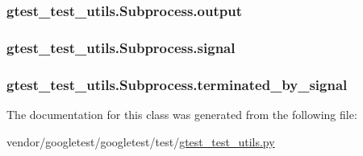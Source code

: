 \subsubsection[{\texorpdfstring{output}{output}}]{\setlength{\rightskip}{0pt plus 5cm}gtest\+\_\+test\+\_\+utils.\+Subprocess.\+output}\hypertarget{classgtest__test__utils_1_1Subprocess_a170f722b867e51f3e97b5b60399988cf}{}\label{classgtest__test__utils_1_1Subprocess_a170f722b867e51f3e97b5b60399988cf}
\subsubsection[{\texorpdfstring{signal}{signal}}]{\setlength{\rightskip}{0pt plus 5cm}gtest\+\_\+test\+\_\+utils.\+Subprocess.\+signal}\hypertarget{classgtest__test__utils_1_1Subprocess_af083cd9621a5d5346ffe800191678ea3}{}\label{classgtest__test__utils_1_1Subprocess_af083cd9621a5d5346ffe800191678ea3}
\subsubsection[{\texorpdfstring{terminated\+\_\+by\+\_\+signal}{terminated_by_signal}}]{\setlength{\rightskip}{0pt plus 5cm}gtest\+\_\+test\+\_\+utils.\+Subprocess.\+terminated\+\_\+by\+\_\+signal}\hypertarget{classgtest__test__utils_1_1Subprocess_a9654b9eddd43c93acf66d5c7b0026fca}{}\label{classgtest__test__utils_1_1Subprocess_a9654b9eddd43c93acf66d5c7b0026fca}


The documentation for this class was generated from the following file\+:\begin{DoxyCompactItemize}
\item 
vendor/googletest/googletest/test/\hyperlink{gtest__test__utils_8py}{gtest\+\_\+test\+\_\+utils.\+py}\end{DoxyCompactItemize}
